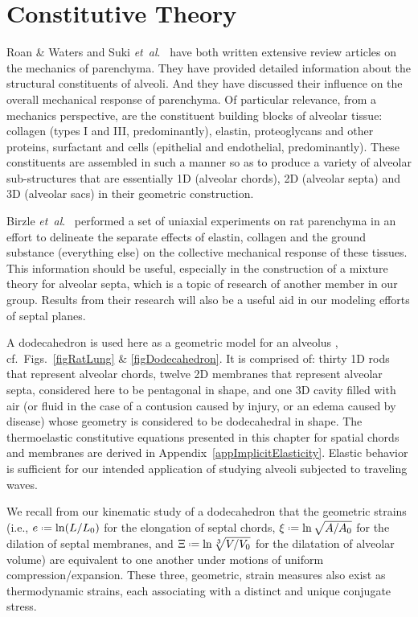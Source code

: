 \part{Constitutive Theory}
\label{partConstitutive}

Roan \& Waters \cite{RoanWaters11} and Suki \textit{et~al}.\ \cite{Sukietal05,Sukietal11} have both written extensive review articles on the mechanics of parenchyma.  They have provided detailed information about the structural constituents of alveoli.  And they have discussed their influence on the overall mechanical response of parenchyma.  Of particular relevance, from a mechanics perspective, are the constituent building blocks of alveolar tissue: collagen (types I and III, predominantly), elastin, proteoglycans and other proteins, surfactant and cells (epithelial and endothelial, predominantly).  These constituents are assembled in such a manner so as to produce a variety of alveolar sub-structures that are essentially 1D (alveolar chords), 2D (alveolar septa) and 3D (alveolar sacs) in their geometric construction.  

Birzle \textit{et~al}.\ \cite{Birzleetal19} performed a set of uniaxial experiments on rat parenchyma in an effort to delineate the separate effects of elastin, collagen and the ground substance (everything else) on the collective mechanical response of these tissues.  This information should be useful, especially in the construction of a mixture theory for alveolar septa, which is a topic of research of another member in our group.  Results from their research will also be a useful aid in our modeling efforts of septal planes.

A dodecahedron is used here as a geometric model for an alveolus \cite{FrankusLee74}, cf.\ Figs.~\ref{figRatLung} \& \ref{figDodecahedron}.  It is comprised of: thirty 1D rods that represent alveolar chords, twelve 2D membranes that represent alveolar septa, considered here to be pentagonal in shape, and one 3D cavity filled with air (or fluid in the case of a contusion caused by injury, or an edema caused by disease) whose geometry is considered to be dodecahedral in shape.  The thermo\-elastic constitutive equations presented in this chapter for spatial chords and membranes are derived in Appendix~\ref{appImplicitElasticity}.  Elastic behavior is sufficient for our intended application of studying alveoli subjected to traveling waves.

We recall from our kinematic study of a dodecahedron that the geometric strains (i.e., $e \defeq \ln ( L / L_0 )$ for the elongation of septal chords, $\xi \defeq \ln \sqrt{A / A_0}$ for the dilation of septal membranes, and $\Xi \defeq \ln \sqrt[3]{V / V_0}$ for the dilatation of alveolar volume) are equivalent to one another under motions of uniform compression\slash expansion.  These three, geometric, strain measures also exist as thermo\-dynamic strains, each associating with a distinct and unique conjugate stress. \cite{Freed17,FreedZamani19}

